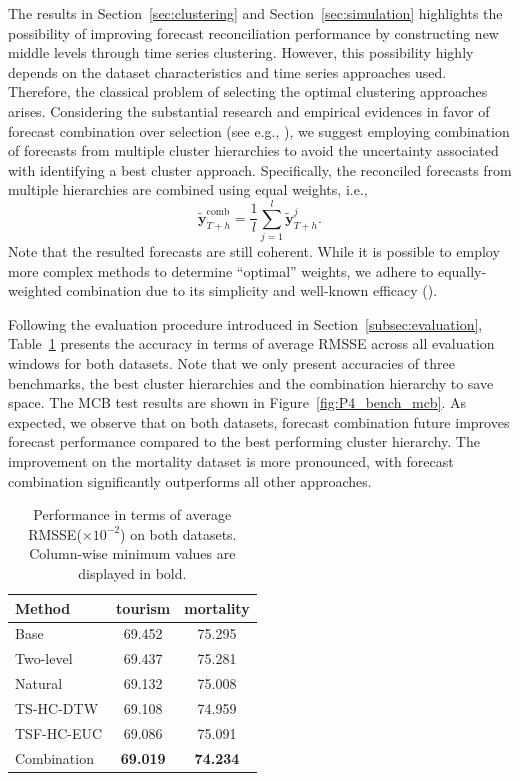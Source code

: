 \documentclass[a4paper,review,12pt,authoryear]{elsarticle}
\begin{document}
The results in Section~\ref{sec:clustering} and Section~\ref{sec:simulation} highlights the possibility of improving forecast reconciliation performance by constructing new middle levels through time series clustering. 
However, this possibility highly depends on the dataset characteristics and time series approaches used.
Therefore, the classical problem of selecting the optimal clustering approaches arises.
Considering the substantial research and empirical evidences in favor of forecast combination over selection (see e.g., \citealp{elliottForecastingEconomicsFinance2016}), we suggest employing combination of forecasts from multiple cluster hierarchies to avoid the uncertainty associated with identifying a best cluster approach.
Specifically, the reconciled forecasts from multiple hierarchies are combined using equal weights, i.e.,
\[
  \tilde{\boldsymbol{y}}_{T+h}^{\text{comb}} = \frac{1}{l} \sum_{j=1}^l \tilde{\boldsymbol{y}}_{T+h}^j.
\] Note that the resulted forecasts are still coherent. 
While it is possible to employ more complex methods to determine ``optimal'' weights, we adhere to equally-weighted combination due to its simplicity and well-known efficacy (\citealp{wangForecastCombinations50year2022}).

Following the evaluation procedure introduced in Section~\ref{subsec:evaluation},
Table~\ref{tab:P4_RMSSE} presents the accuracy in terms of average RMSSE across all evaluation windows for both datasets. Note that we only present accuracies of three benchmarks, the best cluster hierarchies and the combination hierarchy to save space. The MCB test results are shown in Figure~\ref{fig:P4_bench_mcb}. 
As expected, we observe that on both datasets, forecast combination future improves forecast performance compared to the best performing cluster hierarchy. 
The improvement on the mortality dataset is more pronounced, with forecast combination significantly outperforms all other approaches.
\begin{table}[!ht]
    \centering
    \caption{\label{tab:P4_RMSSE}Performance in terms of average RMSSE($\times 10^{-2}$) on both datasets. Column-wise minimum values are displayed in bold.}
    \begin{tabular}{lcc}\toprule
        Method & tourism & mortality \\ \midrule
        Base & 69.452 & 75.295 \\ 
        Two-level & 69.437 & 75.281 \\ 
        Natural & 69.132 & 75.008 \\ 
        TS-HC-DTW & 69.108 & 74.959 \\ 
        TSF-HC-EUC & 69.086 & 75.091 \\ 
        Combination & \textbf{69.019} & \textbf{74.234} \\ \bottomrule
    \end{tabular}
\end{table}
\end{document}
